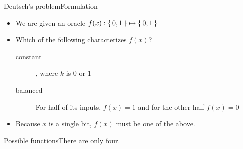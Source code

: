 
\begin{frame}{Deutsch's problem}{Formulation}

\begin{itemize}
    \item We are given an oracle $f(x): \left\{\,0,1\,\right\} \mapsto \left\{\,0,1\,\right\}$
    \item Which of the following characterizes $f(x)$?
    \begin{description}
        \item[constant]   , where $k$ is $0$ or $1$
        \item[balanced]   For half of its inputs, $f(x)=1$ and for the other half $f(x)=0$
    \end{description}
    \item Because $x$ is a single bit, $f(x)$ must be one of the above.
\end{itemize}
    
\end{frame}

\begin{frame}{Possible functions}{There are only four.}

    
\end{frame}

